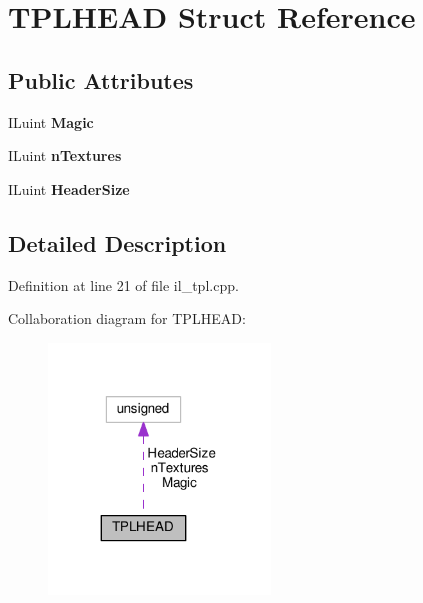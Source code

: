 \hypertarget{structTPLHEAD}{}\section{T\+P\+L\+H\+E\+AD Struct Reference}
\label{structTPLHEAD}
\subsection*{Public Attributes}
\begin{DoxyCompactItemize}
\item 
\mbox{\label{structTPLHEAD_a4dc3fb9afc2b6159957b5ea3d224f248}} 
I\+Luint {\bfseries Magic}
\item 
\mbox{\label{structTPLHEAD_acd23f7f00a37e2232a95858437700054}} 
I\+Luint {\bfseries n\+Textures}
\item 
\mbox{\label{structTPLHEAD_a209061715686ec4371d924a672d7e232}} 
I\+Luint {\bfseries Header\+Size}
\end{DoxyCompactItemize}


\subsection{Detailed Description}


Definition at line 21 of file il\+\_\+tpl.\+cpp.



Collaboration diagram for T\+P\+L\+H\+E\+AD\+:
\nopagebreak
\begin{figure}[H]
\begin{center}
\leavevmode
\includegraphics[width=167pt]{d8/d19/structTPLHEAD__coll__graph}
\end{center}
\end{figure}


